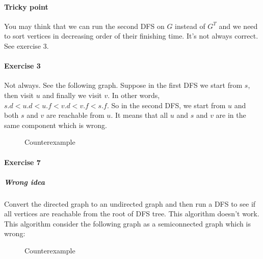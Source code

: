 \documentclass{book}
\begin{document}
	\paragraph{Tricky point} You may think that we can run the second DFS on $G$ instead of $G^T$ and we need to sort vertices in decreasing order of their finishing time. It's not always correct. See exercise 3.
	
	\paragraph{Exercise 3}
	Not always. See the following graph. Suppose in the first DFS we start from $s$, then visit $u$ and finally we visit $v$. In other words, $s.d < u.d < u.f < v.d < v.f < s.f$. So in the second DFS, we start from $u$ and both $s$ and $v$ are reachable from $u$. It means that all $u$ and $s$ and $v$ are in the same component which is wrong.
	
	\begin{figure}[h!]
		\centering
		\caption{Counterexample}
					\end{figure}	
	
	\FloatBarrier
	
	\paragraph{Exercise 7}
	
	\subparagraph{Wrong idea} Convert the directed graph to an undirected graph and then run a DFS to see if all vertices are reachable from the root of DFS tree. This algorithm doesn't work. This algorithm consider the following graph as a semiconnected graph which is wrong:	
	
	\begin{figure}[h!]
		\centering
		\caption{Counterexample}
					\end{figure}	
	
\end{document}
